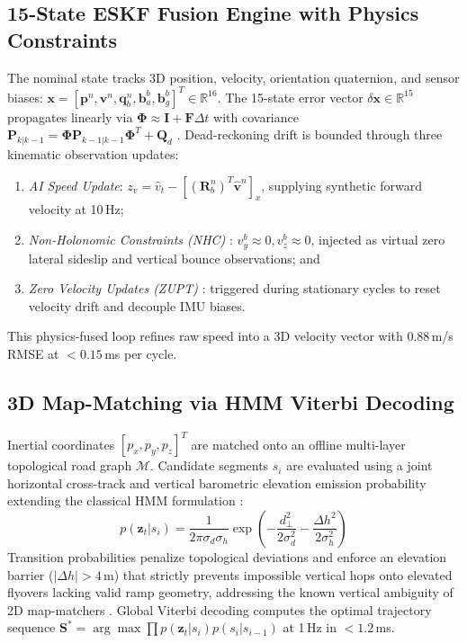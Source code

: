 \documentclass[conference]{IEEEtran}
\begin{document}
\subsection{15-State ESKF Fusion Engine with Physics Constraints}
The nominal state tracks 3D position, velocity, orientation quaternion, and sensor biases: $\mathbf{x} = [\mathbf{p}^n, \mathbf{v}^n, \mathbf{q}_b^n, \mathbf{b}_a^b, \mathbf{b}_g^b]^T \in \mathbb{R}^{16}$. The 15-state error vector $\delta\mathbf{x} \in \mathbb{R}^{15}$ propagates linearly via $\boldsymbol{\Phi} \approx \mathbf{I} + \mathbf{F}\Delta t$ with covariance $\mathbf{P}_{k|k-1} = \boldsymbol{\Phi}\mathbf{P}_{k-1|k-1}\boldsymbol{\Phi}^T + \mathbf{Q}_d$ \cite{sola2017}. Dead-reckoning drift is bounded through three kinematic observation updates:
\begin{enumerate}
\item \textit{AI Speed Update}: $z_v = \hat{v}_t - [(\mathbf{R}_b^n)^T \hat{\mathbf{v}}^n]_x$, supplying synthetic forward velocity at 10\,Hz;
\item \textit{Non-Holonomic Constraints (NHC)} \cite{dissanayake2001}: $v_y^b \approx 0, v_z^b \approx 0$, injected as virtual zero lateral sideslip and vertical bounce observations; and
\item \textit{Zero Velocity Updates (ZUPT)} \cite{foxlin2005}: triggered during stationary cycles to reset velocity drift and decouple IMU biases.
\end{enumerate}
This physics-fused loop refines raw speed into a 3D velocity vector with 0.88\,m/s RMSE at $<0.15$\,ms per cycle.

\subsection{3D Map-Matching via HMM Viterbi Decoding}
Inertial coordinates $[p_x, p_y, p_z]^T$ are matched onto an offline multi-layer topological road graph $\mathcal{M}$. Candidate segments $s_i$ are evaluated using a joint horizontal cross-track and vertical barometric elevation emission probability extending the classical HMM formulation \cite{newson2009}:
\begin{equation}
p(\mathbf{z}_t|s_i) = \frac{1}{2\pi\sigma_d\sigma_h}\exp\left(-\frac{d_{\perp}^2}{2\sigma_d^2} - \frac{\Delta h^2}{2\sigma_h^2}\right)
\end{equation}
Transition probabilities penalize topological deviations and enforce an elevation barrier ($|\Delta h| > 4$\,m) that strictly prevents impossible vertical hops onto elevated flyovers lacking valid ramp geometry, addressing the known vertical ambiguity of 2D map-matchers \cite{sundar2026, javed2024}. Global Viterbi decoding computes the optimal trajectory sequence $\mathbf{S}^* = \arg\max \prod p(\mathbf{z}_t|s_i)p(s_i|s_{i-1})$ at 1\,Hz in $<1.2$\,ms.
\end{document}
